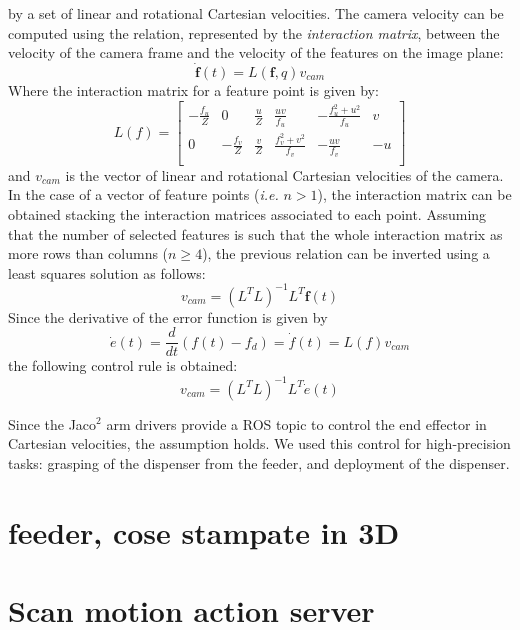 by a set of linear and rotational Cartesian velocities.
The camera velocity can be computed using the relation, represented by the
\textit{interaction matrix}, between the velocity of the camera frame and the velocity of the features on the image plane:
\[
\dot{\boldsymbol{f}}(t) = L(\boldsymbol{f},q)v_{cam}
\]
Where the interaction matrix for a feature point is given by:
\[
L(f)=
\begin{bmatrix}
-\frac{f_u}{Z}	& 0 				& \frac{u}{Z}	& \frac{uv}{f_u} 		& -\frac{f_u^2+u^2}{f_u} & v \\
0			& -\frac{f_v}{Z}	& \frac{v}{Z}	& \frac{f_v^2+v^2}{f_v} &  -\frac{uv}{f_v} & -u\\
\end{bmatrix}
\]
and $v_{cam}$ is the vector of linear and rotational Cartesian velocities of the camera. In the case of a vector of feature points (\textit{i.e.} $n>1$), the interaction matrix can be obtained stacking the interaction matrices associated to each point.
Assuming that the number of selected features is such that the whole interaction matrix as
more rows than columns ($n\geq4$), the previous relation can be inverted using a least squares solution as follows:
\begin{equation}
	v_{cam}=(L^TL)^{-1}L^T\dot{\boldsymbol{f}}(t)
\end{equation}
Since the derivative of the error function is given by 
\[
	\dot{e}(t)=\frac{d}{dt}(f(t)-f_d) = \dot{f}(t) = L(f)v_{cam}
\]
the following control rule is obtained:
\[
v_{cam}=(L^TL)^{-1}L^T\dot{e}(t)
\]

Since the Jaco$^2$ arm drivers provide a \ac{ROS} topic to control the end effector in Cartesian velocities, the assumption holds.
We used this control for high-precision tasks: grasping of the dispenser from the feeder, and deployment of the dispenser.

\section{feeder, cose stampate in 3D}
\section{Scan motion action server}

